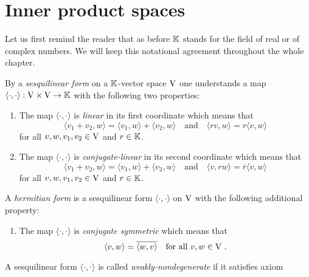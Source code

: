 %
\section{Inner product spaces}
\label{sec:inner-product-spaces}
%
%
\para 
Let us first remind the reader that as before $\mathbb{K}$ stands for the field 
of real or of complex numbers. We will keep this notational agreement 
throughout the whole chapter.
\begin{definition}
By a \emph{sesquilinear form} on a $\mathbb{K}$-vector space $\mathrm{V}$ one understands a map
$\langle \cdot , \cdot \rangle : \mathrm{V} \times \mathrm{V} \to \mathbb{K}$
with the following two properties:
\begin{enumerate}[label={\textup{({\sffamily SF\arabic*})}},leftmargin=*]
\item
\label{axiom:form-linearity-in-first-coordinate} 
  The map $\langle \cdot , \cdot \rangle$ is \emph{linear} in its first coordinate which means that
  \[
    \langle v_1 + v_2, w \rangle = \langle v_1, w \rangle + \langle v_2, w \rangle
    \quad \text{and} \quad \langle r v, w \rangle = r \langle v, w \rangle
  \]
  for all  $v, w , v_1,v_2 \in \mathrm{V}$ and $r\in \mathbb{K}$.
\item
 \label{axiom:form-conjugate-linearity-in-second-coordinate} 
  The map $\langle \cdot , \cdot \rangle$ is \emph{conjugate-linear} in its second coordinate which means that
  \[
    \langle v_1 + v_2, w \rangle = \langle v_1, w \rangle + \langle v_2, w \rangle
    \quad \text{and} \quad \langle  v, r w \rangle = \overline{r} \langle v, w \rangle
  \]
  for all  $v, w , v_1,v_2 \in \mathrm{V}$ and $r\in \mathbb{K}$.
\end{enumerate}
A \emph{hermitian form} is a sesquilinear form $\langle \cdot , \cdot \rangle$ on $\mathrm{V}$ with the following
additional property:
\begin{enumerate}[label={\textup{({\sffamily SF\arabic*})}},leftmargin=*,resume]
\item
\label{axiom:form-conjugate-symmetry} 
  The map $\langle \cdot , \cdot \rangle$ is \emph{conjugate symmetric} which means that 
  \[
    \langle v, w \rangle = \overline{\langle w, v \rangle} \quad \text{for all  } v, w \in \vectorspV \ .
  \]
\end{enumerate}
A sesquilinear form  $\langle \cdot , \cdot \rangle$ is  called
\emph{weakly-nondegenerate} if it satisfies axiom
\begin{enumerate}[label={\textup{({\sffamily SF\arabic*w)}}},leftmargin=*,resume]

\end{enumerate}
\end{definition}
